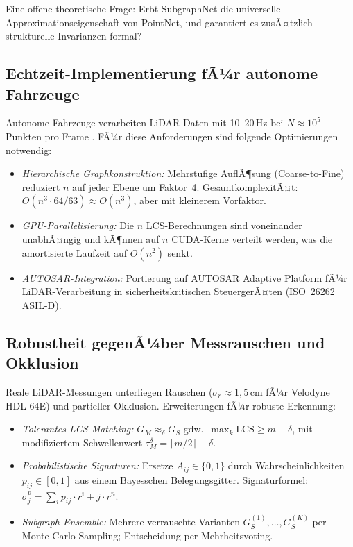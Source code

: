 ﻿\documentclass[a4paper,12pt]{article}
\theoremstyle{definition}
\begin{document}
Eine offene theoretische Frage: Erbt SubgraphNet die universelle
Approximationseigenschaft von PointNet, und garantiert es zusÃ¤tzlich
strukturelle Invarianzen formal?

\subsection{Echtzeit-Implementierung fÃ¼r autonome Fahrzeuge}

Autonome Fahrzeuge verarbeiten LiDAR-Daten mit 10--20\,Hz bei
$N \approx 10^5$ Punkten pro Frame \citep{Waymo2023}. FÃ¼r diese
Anforderungen sind folgende Optimierungen notwendig:

\begin{itemize}
  \item \emph{Hierarchische Graphkonstruktion:} Mehrstufige AuflÃ¶sung
        (Coarse-to-Fine) reduziert $n$ auf jeder Ebene um Faktor~4.
        GesamtkomplexitÃ¤t: $O(n^3 \cdot 64/63) \approx O(n^3)$, aber
        mit kleinerem Vorfaktor.
  \item \emph{GPU-Parallelisierung:} Die $n$ LCS-Berechnungen sind
        voneinander unabhÃ¤ngig und kÃ¶nnen auf $n$ CUDA-Kerne verteilt
        werden, was die amortisierte Laufzeit auf $O(n^2)$ senkt.
  \item \emph{AUTOSAR-Integration:} Portierung auf AUTOSAR Adaptive
        Platform \citep{AUTOSAR2023} fÃ¼r LiDAR-Verarbeitung in
        sicherheitskritischen SteuergerÃ¤ten (ISO~26262 ASIL-D).
\end{itemize}

\subsection{Robustheit gegenÃ¼ber Messrauschen und Okklusion}

Reale LiDAR-Messungen unterliegen Rauschen ($\sigma_r \approx 1{,}5$\,cm
fÃ¼r Velodyne HDL-64E) und partieller Okklusion. Erweiterungen fÃ¼r
robuste Erkennung:

\begin{itemize}
  \item \emph{Tolerantes LCS-Matching:} $G_M \approx_\delta G_S$ gdw.\
        $\max_k \mathrm{LCS} \geq m - \delta$, mit modifiziertem
        Schwellenwert $\tau_M^\delta = \lceil m/2 \rceil - \delta$.
  \item \emph{Probabilistische Signaturen:} Ersetze $A_{ij} \in
        \{0,1\}$ durch Wahrscheinlichkeiten $p_{ij} \in [0,1]$ aus
        einem Bayesschen Belegungsgitter. Signaturformel:
        $\sigma_j^p = \sum_i p_{ij} \cdot r^i + j \cdot r^n$.
  \item \emph{Subgraph-Ensemble:} Mehrere verrauschte Varianten
        $G_S^{(1)}, \ldots, G_S^{(K)}$ per Monte-Carlo-Sampling;
        Entscheidung per Mehrheitsvoting.
\end{itemize}
\end{document}
